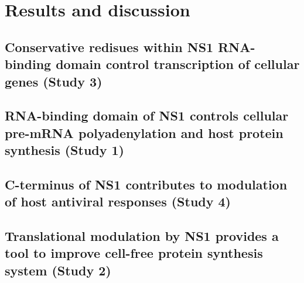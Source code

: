 \newpage
\section{Results and discussion}

	\subsection{Conservative redisues within NS1 RNA-binding domain control transcription of cellular genes (Study 3)}
	
	\subsection{RNA-binding domain of NS1 controls cellular pre-mRNA polyadenylation and host protein synthesis (Study 1)}
	
	\subsection{C-terminus of NS1 contributes to modulation of host antiviral responses (Study 4)}
	
	\subsection{Translational modulation by NS1 provides a tool to improve cell-free protein synthesis system (Study 2)}